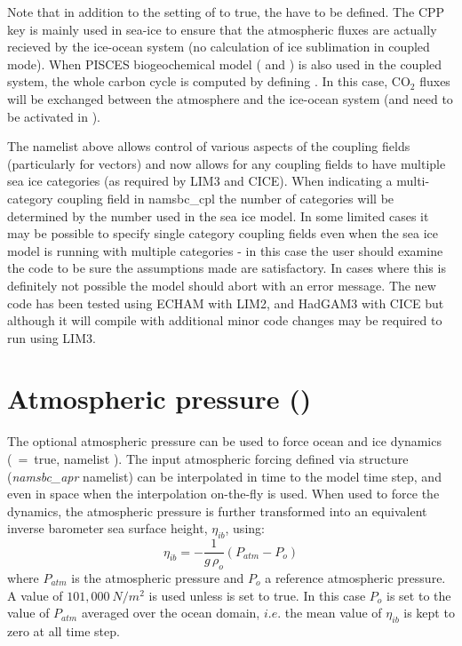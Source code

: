 Note that in addition to the setting of  to true, the  have to be defined. 
The CPP key is mainly used in sea-ice to ensure that the atmospheric fluxes are 
actually recieved by the ice-ocean system (no calculation of ice sublimation in coupled mode).
When PISCES biogeochemical model ( and ) is also used in the coupled system, 
the whole carbon cycle is computed by defining . In this case, 
CO$_2$ fluxes will be exchanged between the atmosphere and the ice-ocean system (and need to be activated in  ).

The namelist above allows control of various aspects of the coupling fields (particularly for
vectors) and now allows for any coupling fields to have multiple sea ice categories (as required by LIM3
and CICE).  When indicating a multi-category coupling field in namsbc{\_}cpl the number of categories will be
determined by the number used in the sea ice model.  In some limited cases it may be possible to specify 
single category coupling fields even when the sea ice model is running with multiple categories - in this
case the user should examine the code to be sure the assumptions made are satisfactory.  In cases where
this is definitely not possible the model should abort with an error message.  The new code has been tested using
ECHAM with LIM2, and HadGAM3 with CICE but although it will compile with  additional minor code changes
may be required to run using LIM3.


\section   [Atmospheric pressure (\textit{sbcapr})]
			{Atmospheric pressure ()}
\label{SBC_apr}

The optional atmospheric pressure can be used to force ocean and ice dynamics 
(~=~true, \textit{} namelist ).
The input atmospheric forcing defined via  structure (\textit{namsbc\_apr} namelist) 
can be interpolated in time to the model time step, and even in space when the 
interpolation on-the-fly is used. When used to force the dynamics, the atmospheric 
pressure is further transformed into an equivalent inverse barometer sea surface height, 
$\eta_{ib}$, using:
\begin{equation} \label{SBC_ssh_ib}
	\eta_{ib} = -  \frac{1}{g\,\rho_o}  \left( P_{atm} - P_o \right) 
\end{equation}
where $P_{atm}$ is the atmospheric pressure and $P_o$ a reference atmospheric pressure.
A value of $101,000~N/m^2$ is used unless  is set to true. In this case $P_o$ 
is set to the value of $P_{atm}$ averaged over the ocean domain, $i.e.$ the mean value of 
$\eta_{ib}$ is kept to zero at all time step.

